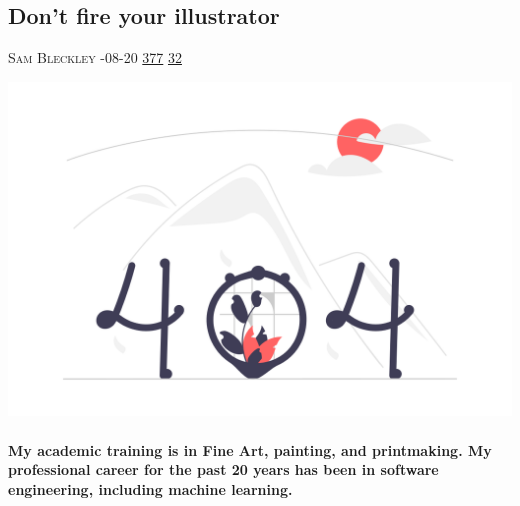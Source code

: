 \documentclass[10pt,a4paper]{article}
\begin{document}
\begin{multicols*}{2}

\noindent\begin{minipage}{\linewidth}
\subsection{Don't fire your illustrator}
\textsc{\footnotesize
{\scriptsize\faUser}\space 
Sam Bleckley 
{\scriptsize\faCalendar}-08-20 
{\scriptsize\faThumbsOUp}\space 
\href{http://news.ycombinator.com/item?id=37210953\&utm\_term=comment}{377} 
{\scriptsize\faComments}\space 
\href{http://news.ycombinator.com/item?id=37210953\&utm\_term=comment}{32} 
}
\par\medskip\noindent
\href{https://sambleckley.com/writing/dont-fire-your-illustrator.html?utm\_source=hackernewsletter\&utm\_medium=email\&utm\_term=design}{
    \includegraphics[width=0.99\linewidth]{notfound.png}
}
\end{minipage}
\paragraph{}
\textbf{My academic training is in Fine Art, painting, and printmaking. My professional career for the past 20 years has been in software engineering, including machine learning.}

\end{multicols*}
\end{document}
